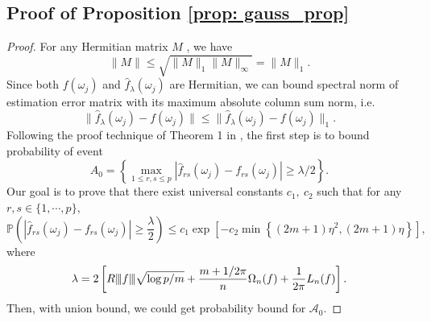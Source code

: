 \subsection{Proof of Proposition \ref{prop: gauss_prop}}
\begin{proof}
For any Hermitian matrix $M$ \cite{golub2012matrix}, we have
\begin{equation}
\|M\|\le \sqrt{\|M\|_1 \|M\|_\infty} = \|M\|_1.
\end{equation}
Since both $f(\omega_j)$ and $\hat{f}_{\lambda}(\omega_j)$ are Hermitian, we can bound { spectral norm} of estimation error matrix with its { maximum absolute column sum norm}, i.e.
\begin{equation}
\label{eq:L1_error}
\|\hat{f}_{\lambda}(\omega_j)-f(\omega_j)\| \le \|\hat{f}_{\lambda}(\omega_j)-f(\omega_j)\|_1.
\end{equation}
Following the proof technique of Theorem 1 in \citet{bickel2008covariance}, the first step is to bound probability of event 
\begin{equation}
A_0 = \left\{\max_{1\le r,s \le p}|\hat{f}_{rs}(\omega_j) - f_{rs}(\omega_j)| \ge \lambda/2 \right\}. \nonumber
\end{equation}
Our goal is to prove that there exist universal constants $c_1, ~ c_2$ such that for any $r,s \in\{1,\cdots, p\}$, 
\begin{equation}
\mathbb{P}\left(\left|\hat{f}_{rs}(\omega_j) - f_{rs}(\omega_j)\right|\ge \frac{\lambda}{2} \right) \le c_1 \exp\left[-c_2\min\left\{(2m+1)\eta^2, (2m+1)\eta\right\}\right], \nonumber
\end{equation}
where 
\begin{equation}
\lambda = 2\left[ R{\left\vert\kern-0.25ex\left\vert\kern-0.25ex\left\vert f \right\vert\kern-0.25ex\right\vert\kern-0.25ex\right\vert}\sqrt{\log p/m} + \frac{m+1/2\pi}{n}\Omega_n(f) + \frac{1}{2\pi}L_n(f)\right]. \nonumber
\end{equation}
Then, with union bound, we could get probability bound for $\mathcal{A}_0$. 


\end{proof}
